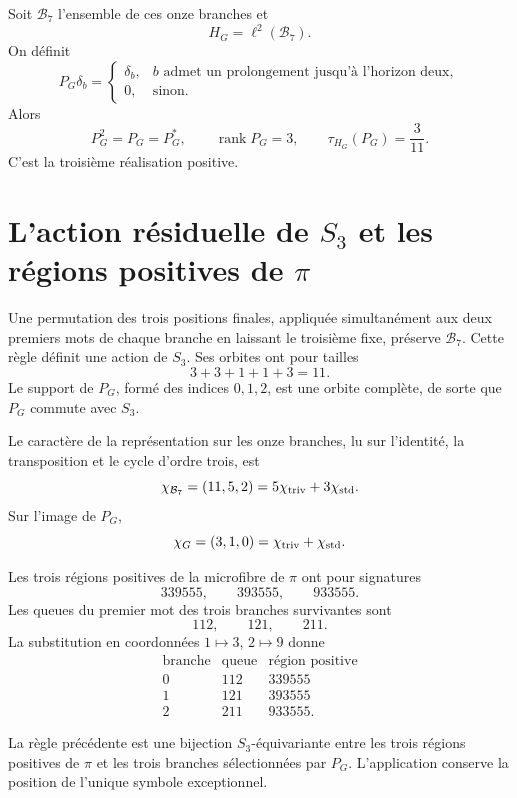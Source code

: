 Soit \(\mathcal B_7\) l'ensemble de ces onze branches et
\[
 H_G=\ell^2(\mathcal B_7).
\]
On définit
\[
 P_G\delta_b=
 \begin{cases}
 \delta_b,&b\text{ admet un prolongement jusqu’à l’horizon deux},\\
 0,&\text{sinon}.
 \end{cases}
\]
Alors
\[
 P_G^2=P_G=P_G^*,
 \qquad
 \operatorname{rank}P_G=3,
 \qquad
 \boxed{\tau_{H_G}(P_G)=\frac3{11}.}
\]
C'est la troisième réalisation positive.

\section{L'action résiduelle de \texorpdfstring{\(S_3\)}{S3} et les régions positives de \texorpdfstring{\(\pi\)}{pi}}

Une permutation des trois positions finales, appliquée simultanément aux
deux premiers mots de chaque branche en laissant le troisième fixe, préserve
\(\mathcal B_7\). Cette règle définit une action de \(S_3\). Ses orbites
ont pour tailles
\[
 3+3+1+1+3=11.
\]
Le support de \(P_G\), formé des indices \(0,1,2\), est une orbite
complète, de sorte que \(P_G\) commute avec \(S_3\).

Le caractère de la représentation sur les onze branches, lu sur l'identité,
la transposition et le cycle d'ordre trois, est
\[
 \chi_{\mathcal B_7}=(11,5,2)
 =5\chi_{\rm triv}+3\chi_{\rm std}.
\]
Sur l'image de \(P_G\),
\[
 \chi_G=(3,1,0)
 =\chi_{\rm triv}+\chi_{\rm std}.
\]

Les trois régions positives de la microfibre de \(\pi\) ont pour signatures
\[
 339555,\qquad393555,\qquad933555.
\]
Les queues du premier mot des trois branches survivantes sont
\[
 112,\qquad121,\qquad211.
\]
La substitution en coordonnées \(1\mapsto3\), \(2\mapsto9\) donne
\[
\begin{array}{c|c|c}
\text{branche}&\text{queue}&\text{région positive}\\ \hline
0&112&339555\\
1&121&393555\\
2&211&933555.
\end{array}
\]

\begin{theorem}
\label{thm:puente-pi-puerta-s3}
La règle précédente est une bijection \(S_3\)-équivariante entre les trois
régions positives de \(\pi\) et les trois branches sélectionnées par \(P_G\).
L'application conserve la position de l'unique symbole exceptionnel.
\end{theorem}

